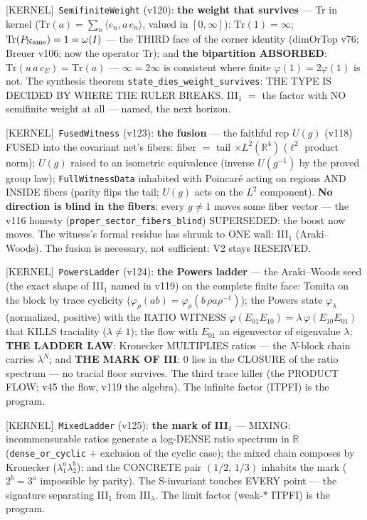\documentclass[11pt]{article}
\providecommand{\kernelmk}[1]{\textsf{[KERNEL]}~\texttt{#1}}\providecommand{\knownmk}[1]{\textsf{[KNOWN]}~{#1}}\providecommand{\statusmk}[1]{\textsf{[#1]}}
\theoremstyle{definition}\newtheorem{deriv}{Derivation}
\begin{document}
\kernelmk{SemifiniteWeight} (v120): \textbf{the weight that survives} --- Tr in kernel ($\mathrm{Tr}(a)=\sum_n\langle e_n,a\,e_n\rangle$, valued in $[0,\infty]$): $\mathrm{Tr}(1)=\infty$; \textbf{$\mathrm{Tr}(P_{\rm Name})=1=\omega(I)$} --- the THIRD face of the corner identity (dimOrTop v76; Breuer v106; now the operator Tr); and \textbf{the bipartition ABSORBED}: $\mathrm{Tr}(u\,a\,c_E)=\mathrm{Tr}(a)$ --- $\infty=2\infty$ is consistent where finite $\varphi(1)=2\varphi(1)$ is not. The synthesis theorem \texttt{state\_dies\_weight\_survives}: THE TYPE IS DECIDED BY WHERE THE RULER BREAKS. III$_1$ $=$ the factor with NO semifinite weight at all --- named, the next horizon.

\kernelmk{FusedWitness} (v123): \textbf{the fusion} --- the faithful rep $U(g)$ (v118) FUSED into the covariant net's fibers: fiber $=$ tail $\times L^2(\mathbb{R}^4)$ ($\ell^2$ product norm); $U(g)$ raised to an isometric equivalence (inverse $U(g^{-1})$ by the proved group law); \texttt{FullWitnessData} inhabited with Poincaré acting on regions AND INSIDE fibers (parity flips the tail; $U(g)$ acts on the $L^2$ component). \textbf{No direction is blind in the fibers}: every $g\neq 1$ moves some fiber vector --- the v116 honesty (\texttt{proper\_sector\_fibers\_blind}) SUPERSEDED: the boost now moves. The witness's formal residue has shrunk to ONE wall: III$_1$ (Araki--Woods). The fusion is necessary, not sufficient: V2 stays RESERVED.

\kernelmk{PowersLadder} (v124): \textbf{the Powers ladder} --- the Araki--Woods seed (the exact shape of III$_1$ named in v119) on the complete finite face: Tomita on the block by trace cyclicity ($\varphi_\rho(ab)=\varphi_\rho(b\,\rho a\rho^{-1})$); the Powers state $\varphi_\lambda$ (normalized, positive) with the RATIO WITNESS $\varphi(E_{01}E_{10})=\lambda\,\varphi(E_{10}E_{01})$ that KILLS traciality ($\lambda\neq1$); the flow with $E_{01}$ an eigenvector of eigenvalue $\lambda$; \textbf{THE LADDER LAW}: Kronecker MULTIPLIES ratios — the $N$-block chain carries $\lambda^N$; and \textbf{THE MARK OF III}: $0$ lies in the CLOSURE of the ratio spectrum — no tracial floor survives. The third trace killer (the PRODUCT FLOW; v45 the flow, v119 the algebra). The infinite factor (ITPFI) is the program.

\kernelmk{MixedLadder} (v125): \textbf{the mark of III$_1$} --- MIXING: incommensurable ratios generate a log-DENSE ratio spectrum in $\mathbb{R}$ (\texttt{dense\_or\_cyclic} $+$ exclusion of the cyclic case); the mixed chain composes by Kronecker ($\lambda_1^a\lambda_2^b$); and the CONCRETE pair $(1/2,\,1/3)$ inhabits the mark ($2^b=3^a$ impossible by parity). The S-invariant touches EVERY point — the signature separating III$_1$ from III$_\lambda$. The limit factor (weak-$*$ ITPFI) is the program.
\end{document}
